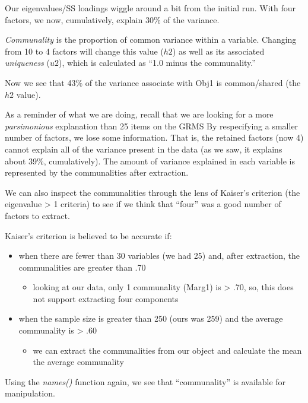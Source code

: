 \documentclass[
  english,
]{book}
\providecommand{\tightlist}{%
  \setlength{\itemsep}{0pt}\setlength{\parskip}{0pt}}
\begin{document}
Our eigenvalues/SS loadings wiggle around a bit from the initial run. With four factors, we now, cumulatively, explain 30\% of the variance.

\emph{Communality} is the proportion of common variance within a variable. Changing from 10 to 4 factors will change this value (\(h2\)) as well as its associated \emph{uniqueness} (\(u2\)), which is calculated as ``1.0 minus the communality.''

Now we see that 43\% of the variance associate with Obj1 is common/shared (the \(h2\) value).

As a reminder of what we are doing, recall that we are looking for a more \emph{parsimonious} explanation than 25 items on the GRMS By respecifying a smaller number of factors, we lose some information. That is, the retained factors (now 4) cannot explain all of the variance present in the data (as we saw, it explains about 39\%, cumulatively). The amount of variance explained in each variable is represented by the communalities after extraction.

We can also inspect the communalities through the lens of Kaiser's criterion (the eigenvalue \textgreater{} 1 criteria) to see if we think that ``four'' was a good number of factors to extract.

Kaiser's criterion is believed to be accurate if:

\begin{itemize}
\tightlist
\item
  when there are fewer than 30 variables (we had 25) and, after extraction, the communalities are greater than .70

  \begin{itemize}
  \tightlist
  \item
    looking at our data, only 1 communality (Marg1) is \textgreater{} .70, so, this does not support extracting four components
  \end{itemize}
\item
  when the sample size is greater than 250 (ours was 259) and the average communality is \textgreater{} .60

  \begin{itemize}
  \tightlist
  \item
    we can extract the communalities from our object and calculate the mean the average communality
  \end{itemize}
\end{itemize}

Using the \emph{names()} function again, we see that ``communality'' is available for manipulation.
\end{document}

